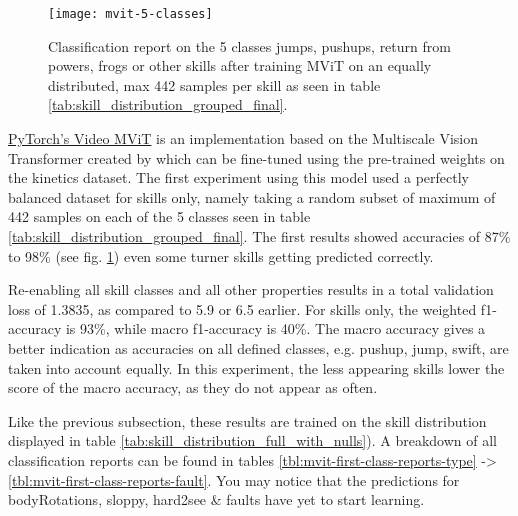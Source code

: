 \begin{figure}
    \centering
    \texttt{[image: mvit-5-classes]}
    \caption[Classification report on only 5 skill classes]{Classification report on the 5 classes jumps, pushups, return from powers, frogs or other skills after training MViT on an equally distributed, max 442 samples per skill as seen in table \ref{tab:skill_distribution_grouped_final}.}
    \label{fig:mvit-5-classes}
\end{figure}


\href{https://pytorch.org/vision/main/models/video_mvit.html}{PyTorch's Video MViT} is an implementation based on the Multiscale Vision Transformer created by \textcite{Fan2021} which can be fine-tuned using the pre-trained weights on the kinetics dataset.
The first experiment using this model used a perfectly balanced dataset for skills only, namely taking a random subset of maximum of 442 samples on each of the 5 classes seen in table \ref{tab:skill_distribution_grouped_final}.
The first results showed accuracies of 87\% to 98\% (see fig. \ref{fig:mvit-5-classes}) even some turner skills getting predicted correctly.

Re-enabling all skill classes and all other properties results in a total validation loss of 1.3835, as compared to 5.9 or 6.5 earlier.
For skills only, the weighted f1-accuracy is 93\%, while macro f1-accuracy is 40\%.
The macro accuracy gives a better indication as accuracies on all defined classes, e.g. pushup, jump, swift, are taken into account equally. In this experiment, the less appearing skills lower the score of the macro accuracy, as they do not appear as often.

Like the previous subsection, these results are trained on the skill distribution displayed in table \ref{tab:skill_distribution_full_with_nulls}).
A breakdown of all classification reports can be found in tables \ref{tbl:mvit-first-class-reports-type} -> \ref{tbl:mvit-first-class-reports-fault}. You may notice that the predictions for bodyRotations, sloppy, hard2see \& faults have yet to start learning.

